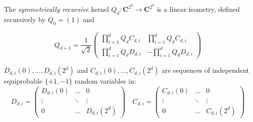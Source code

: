 \documentclass[10pt]{article}
\begin{document}
The \textit{symmetrically recursive} kernel $Q_d:\mathbf{C}^{2^d}\to\mathbf{C}^{2^d}$ is a linear isometry, defined recursively by $Q_0=\left(1\right)$ and

\[
Q_{d+1}=\frac{1}{\sqrt{2}}
\left(
\begin{matrix}
\prod_{i=1}^d Q_d C_{d,i}& \prod_{i=1}^d  Q_d C_{d,i}\\
\prod_{i=1}^d Q_d D_{d,i}& -\prod_{i=1}^d  Q_d D_{d,i}
\end{matrix}\right)
\]

$D_{d,i}(0),\dots,D_{d,i}(2^d)$ and $C_{d,i}(0),\dots,C_{d,i}(2^d)$ are sequences of independent equiprobable $\{+1,-1\}$ random variables in:
\[
D_{d,i} = \left(
\begin{matrix}
D_{d,i}(0) & \dots & 0 \\
\vdots & \ddots & \vdots \\
0 & \dots & D_{d,i}(2^d)
\end{matrix}\right)
\quad
C_{d,i} = \left(
\begin{matrix}
C_{d,i}(0) & \dots & 0 \\
\vdots & \ddots & \vdots \\
0 & \dots & C_{d,i}(2^d)
\end{matrix}\right)
\]
\end{document}
